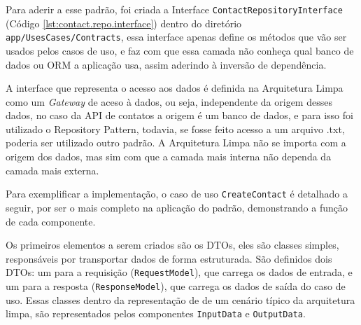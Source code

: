     \par Para aderir a esse padrão, foi criada a Interface \texttt{ContactRepositoryInterface} (Código \ref{lst:contact.repo.interface})  dentro do diretório \texttt{app/UsesCases/Contracts}, essa interface apenas define os métodos que vão ser usados pelos casos de uso, e faz com que essa camada não conheça qual banco de dados ou ORM a aplicação usa, assim aderindo à inversão de dependência.

    \par A interface que representa o acesso aos dados é definida na Arquitetura Limpa como um \textit{Gateway} de aceso à dados, ou seja, independente da origem desses dados, no caso da API de contatos a origem é um banco de dados, e para isso foi utilizado o Repository Pattern, todavia, se fosse feito acesso a um arquivo .txt, poderia ser utilizado outro padrão. A Arquitetura Limpa não se importa com a origem dos dados, mas sim com que a camada mais interna não dependa da camada mais externa.

    
    
    \par Para exemplificar a implementação, o caso de uso \texttt{CreateContact} é detalhado a seguir, por ser o mais completo na aplicação do padrão, demonstrando a função de cada componente.
        
    \par Os primeiros elementos a serem criados são os DTOs, eles são classes simples, responsáveis por transportar dados de forma estruturada. São definidos dois DTOs: um para a requisição (\texttt{RequestModel}), que carrega os dados de entrada, e um para a resposta (\texttt{ResponseModel}), que carrega os dados de saída do caso de uso. Essas classes dentro da representação de \cite{livro:martin:cleanarch} de um cenário típico da arquitetura limpa, são representados pelos componentes \texttt{InputData} e  \texttt{OutputData}.
        
    
        
    
        
